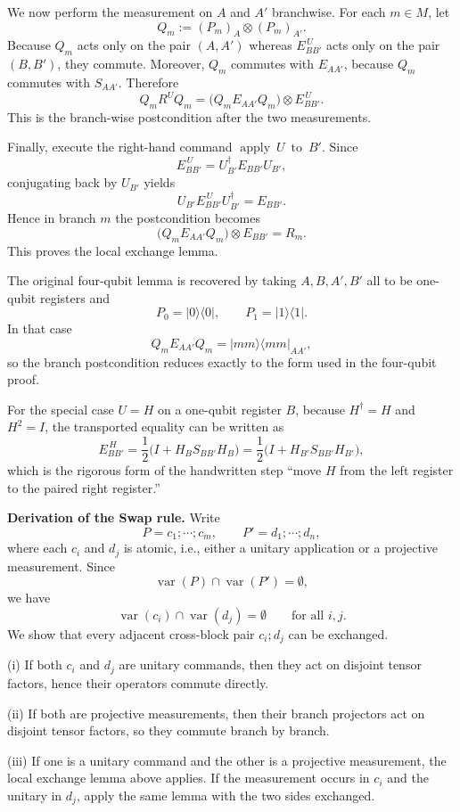 \documentclass{report}
\theoremstyle{defn_style}
\begin{document}
We now perform the measurement on $A$ and $A'$ branchwise.
For each $m\in M$, let
\[
Q_m := (P_m)_A\otimes (P_m)_{A'} .
\]
Because $Q_m$ acts only on the pair $(A,A')$ whereas $E_{BB'}^{\,U}$ acts only on
the pair $(B,B')$, they commute.  Moreover, $Q_m$ commutes with $E_{AA'}$,
because $Q_m$ commutes with $S_{AA'}$.
Therefore
\[
Q_mR^{U}Q_m
=
\bigl(Q_mE_{AA'}Q_m\bigr)\otimes E_{BB'}^{\,U}.
\]
This is the branch-wise postcondition after the two measurements.

Finally, execute the right-hand command $\operatorname{apply}\ U\ \operatorname{to}\ B'$.
Since
\[
E_{BB'}^{\,U}=U_{B'}^\dagger E_{BB'}U_{B'},
\]
conjugating back by $U_{B'}$ yields
\[
U_{B'}E_{BB'}^{\,U}U_{B'}^\dagger = E_{BB'}.
\]
Hence in branch $m$ the postcondition becomes
\[
\bigl(Q_mE_{AA'}Q_m\bigr)\otimes E_{BB'} = R_m.
\]
This proves the local exchange lemma.

\medskip
\noindent
The original four-qubit lemma is recovered by taking $A,B,A',B'$ all to be
one-qubit registers and
\[
P_0=|0\rangle\langle 0|,
\qquad
P_1=|1\rangle\langle 1|.
\]
In that case
\[
Q_mE_{AA'}Q_m = |mm\rangle\langle mm|_{AA'},
\]
so the branch postcondition reduces exactly to the form used in the four-qubit proof.

\medskip
\noindent
For the special case $U=H$ on a one-qubit register $B$, because $H^\dagger=H$
and $H^2=I$, the transported equality can be written as
\[
E_{BB'}^{\,H}
=
\frac12\bigl(I+H_BS_{BB'}H_B\bigr)
=
\frac12\bigl(I+H_{B'}S_{BB'}H_{B'}\bigr),
\]
which is the rigorous form of the handwritten step ``move $H$ from the left register
to the paired right register.''

\medskip
\noindent\textbf{Derivation of the Swap rule.}
Write
\[
P=c_1;\cdots;c_m,
\qquad
P'=d_1;\cdots;d_n,
\]
where each $c_i$ and $d_j$ is atomic, i.e., either a unitary application or a
projective measurement.
Since
\[
\operatorname{var}(P)\cap\operatorname{var}(P')=\emptyset,
\]
we have
\[
\operatorname{var}(c_i)\cap\operatorname{var}(d_j)=\emptyset
\qquad
\text{for all } i,j.
\]
We show that every adjacent cross-block pair $c_i;d_j$ can be exchanged.

\smallskip
\noindent
(i) If both $c_i$ and $d_j$ are unitary commands, then they act on disjoint tensor
factors, hence their operators commute directly.

\smallskip
\noindent
(ii) If both are projective measurements, then their branch projectors act on
disjoint tensor factors, so they commute branch by branch.

\smallskip
\noindent
(iii) If one is a unitary command and the other is a projective measurement,
the local exchange lemma above applies.  If the measurement occurs in $c_i$ and the
unitary in $d_j$, apply the same lemma with the two sides exchanged.
\end{document}
